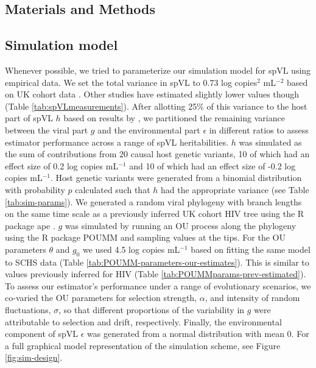 \documentclass[11pt]{article}
\begin{document}
\begin{linenumbers}
\section*{Materials and Methods}

\subsection*{Simulation model}

Whenever possible, we tried to parameterize our simulation model for spVL using empirical data. We set the total variance in spVL to 0.73 log copies$^2$ mL$^{-2}$ based on UK cohort data \citep{Mitov2018}. Other studies have estimated slightly lower values though (Table \ref{tab:spVLmeasurements}). After allotting 25\% of this variance to the host part of spVL $h$ based on results by \citet{McLaren2015}, we partitioned the remaining variance between the viral part $g$ and the environmental part $\epsilon$ in different ratios to assess estimator performance across a range of spVL heritabilities. $h$ was simulated as the sum of contributions from 20 causal host genetic variants, 10 of which had an effect size of 0.2 log copies mL$^{-1}$ and 10 of which had an effect size of -0.2 log copies mL$^{-1}$. Host genetic variants were generated from a binomial distribution with probability $p$ calculated such that $h$ had the appropriate variance (see Table \ref{tab:sim-params}). We generated a random viral phylogeny with branch lengths on the same time scale as a previously inferred UK cohort HIV tree \citep{Hodcroft2014} using the R package ape \citep{Paradis2018}. $g$ was simulated by running an OU process along the phylogeny using the R package POUMM \citep{Mitov2017a-POUMM} and sampling values at the tips. For the OU parameters $\theta$ and $g_{0}$ we used 4.5 log copies mL$^{-1}$ based on fitting the same model to SCHS data (Table \ref{tab:POUMM-parameters-our-estimates}). This is similar to values previously inferred for HIV (Table \ref{tab:POUMMparams-prev-estimated}). To assess our estimator's performance under a range of evolutionary scenarios, we co-varied the OU parameters for selection strength, $\alpha$, and intensity of random fluctuations, $\sigma$, so that different proportions of the variability in $g$ were attributable to selection and drift, respectively. Finally, the environmental component of spVL $\epsilon$ was generated from a normal distribution with mean 0.  For a full graphical model representation of the simulation scheme, see Figure \ref{fig:sim-design}.


\end{linenumbers}
\end{document}
